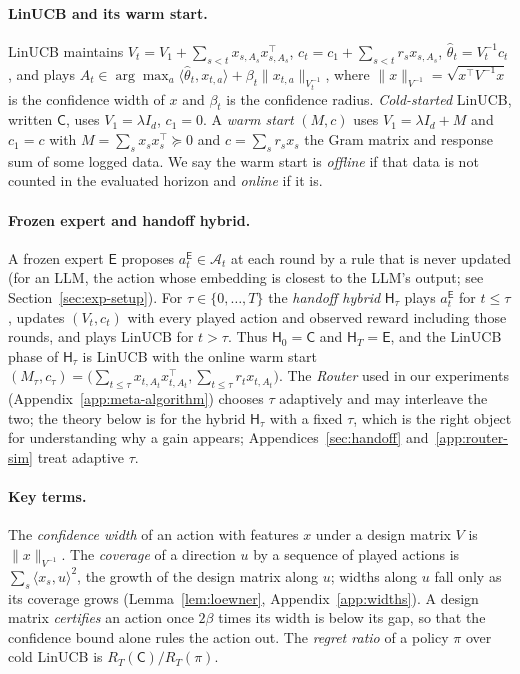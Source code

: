 \documentclass[anon]{alt2027} %
\newcommand{\Cold}{\mathsf{C}}
\newcommand{\Exp}{\mathsf{E}}
\newcommand{\Hyb}{\mathsf{H}}
\begin{document}
\paragraph{LinUCB and its warm start.}
LinUCB maintains $V_t=V_1+\sum_{s<t}x_{s,A_s}x_{s,A_s}^\top$,
$c_t=c_1+\sum_{s<t}r_sx_{s,A_s}$, $\widehat\theta_t=V_t^{-1}c_t$, and plays
$A_t\in\arg\max_a\langle\widehat\theta_t,x_{t,a}\rangle+\beta_t\|x_{t,a}\|_{V_t^{-1}}$,
where $\|x\|_{V^{-1}}=\sqrt{x^\top V^{-1}x}$ is the confidence width of $x$ and
$\beta_t$ is the confidence radius. \emph{Cold-started} LinUCB, written
$\Cold$, uses $V_1=\lambda I_d$, $c_1=0$. A \emph{warm start} $(M,c)$ uses
$V_1=\lambda I_d+M$ and $c_1=c$ with $M=\sum_sx_sx_s^\top\succeq0$ and
$c=\sum_sr_sx_s$ the Gram matrix and response sum of some logged data. We say
the warm start is \emph{offline} if that data is not counted in the evaluated
horizon and \emph{online} if it is.

\paragraph{Frozen expert and handoff hybrid.}
A frozen expert $\Exp$ proposes $a_t^{\Exp}\in\mathcal A_t$ at each round by a
rule that is never updated (for an LLM, the action whose embedding is closest
to the LLM's output; see Section~\ref{sec:exp-setup}). For $\tau\in\{0,\dots,T\}$
the \emph{handoff hybrid} $\Hyb_\tau$ plays $a_t^{\Exp}$ for $t\le\tau$, updates
$(V_t,c_t)$ with every played action and observed reward including those
rounds, and plays LinUCB for $t>\tau$. Thus $\Hyb_0=\Cold$ and $\Hyb_T=\Exp$,
and the LinUCB phase of $\Hyb_\tau$ is LinUCB with the online warm start
$(M_\tau,c_\tau)=\bigl(\sum_{t\le\tau}x_{t,A_t}x_{t,A_t}^\top,\sum_{t\le\tau}r_tx_{t,A_t}\bigr)$.
The \emph{Router} used in our experiments
(Appendix~\ref{app:meta-algorithm}) chooses $\tau$ adaptively and may
interleave the two; the theory below is for the hybrid $\Hyb_\tau$ with a fixed $\tau$, which is the
right object for understanding why a gain appears; Appendices~\ref{sec:handoff}
and~\ref{app:router-sim} treat adaptive $\tau$.

\paragraph{Key terms.}
The \emph{confidence width} of an action with features $x$ under a design
matrix $V$ is $\|x\|_{V^{-1}}$. The \emph{coverage} of a direction $u$ by a
sequence of played actions is $\sum_s\langle x_s,u\rangle^2$, the growth of
the design matrix along $u$; widths along $u$ fall only as its coverage grows
(Lemma~\ref{lem:loewner}, Appendix~\ref{app:widths}). A design matrix
\emph{certifies} an action once $2\beta$ times its width is below its gap, so
that the confidence bound alone rules the action out. The \emph{regret ratio}
of a policy $\pi$ over cold LinUCB is $R_T(\Cold)/R_T(\pi)$.
\end{document}

